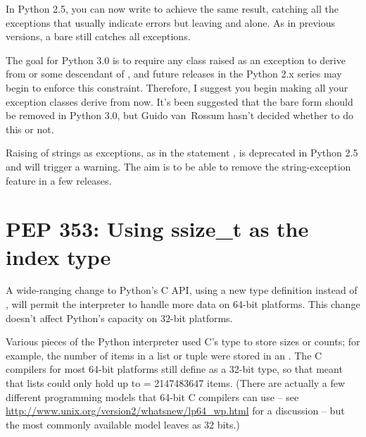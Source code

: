 \documentclass{howto}
\begin{document}
In Python 2.5, you can now write  to achieve
the same result, catching all the exceptions that usually indicate errors 
but leaving  and
 alone.  As in previous versions,
a bare  still catches all exceptions.

The goal for Python 3.0 is to require any class raised as an exception
to derive from  or some descendant of
, and future releases in the
Python 2.x series may begin to enforce this constraint.  Therefore, I
suggest you begin making all your exception classes derive from
 now.  It's been suggested that the bare
 form should be removed in Python 3.0, but Guido van~Rossum
hasn't decided whether to do this or not.

Raising of strings as exceptions, as in the statement , is deprecated in Python 2.5 and will trigger a
warning.  The aim is to be able to remove the string-exception feature
in a few releases.


\begin{seealso}


\end{seealso}


\section{PEP 353: Using ssize_t as the index type\label{pep-353}}

A wide-ranging change to Python's C API, using a new 
 type definition instead of , 
will permit the interpreter to handle more data on 64-bit platforms.
This change doesn't affect Python's capacity on 32-bit platforms.

Various pieces of the Python interpreter used C's  type to
store sizes or counts; for example, the number of items in a list or
tuple were stored in an .  The C compilers for most 64-bit
platforms still define  as a 32-bit type, so that meant
that lists could only hold up to  = 2147483647 items.
(There are actually a few different programming models that 64-bit C
compilers can use -- see
\url{http://www.unix.org/version2/whatsnew/lp64_wp.html} for a
discussion -- but the most commonly available model leaves 
as 32 bits.)
\end{document}
